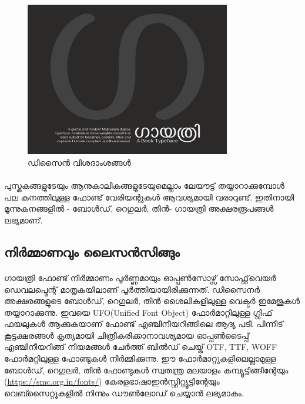 \documentclass[12pt]{article}
\begin{document}
	\begin{figure}
		\begin{centering}
			\includegraphics[width=0.8\textwidth]{ga.jpg}
			\caption{ഡിസൈന്‍ വിശദാംശങ്ങള്‍}
			\label{one}
		\end{centering}
	\end{figure}
	
	\paragraph{}
	പുസ്തകങ്ങളുടേയും ആനുകാലികങ്ങളുടേയുമെല്ലാം ലേയൗട്ട് തയ്യാറാക്കുമ്പോള്‍ പല കനത്തിലുള്ള ഫോണ്ട് വേരിയന്റുകള്‍ ആവശ്യമായി വരാറുണ്ട്. ഇതിനായി മൂന്നുകനങ്ങളില്‍ - ബോള്‍ഡ്, റെഗുലര്‍, തിന്‍- ഗായത്രി അക്ഷരരൂപങ്ങള്‍ ലഭ്യമാണ്. 
	
	\subsection{നിര്‍മ്മാണവും ലൈസന്‍സിങ്ങും}
	
	\paragraph{}
	ഗായത്രി ഫോണ്ട് നിര്‍മ്മാണം പൂര്‍ണ്ണമായും ഓപ്പണ്‍സോഴ്സ് സോഫ്റ്റ്‌വെയര്‍ ഡെവലപ്മെന്റ് മാതൃകയിലാണ് പൂര്‍ത്തിയായിരിക്കുന്നത്. ഡിസൈനര്‍ അക്ഷരങ്ങളുടെ ബോള്‍ഡ്, റെഗുലര്‍, തിന്‍ ശൈലികളിലുള്ള വെക്ടര്‍ ഇമേജുകള്‍ തയ്യാറാക്കുന്നു. ഇവയെ UFO(Unified Font Object) ഫോര്‍മാറ്റിലുള്ള ഗ്ലിഫ് ഫയലുകള്‍ ആക്കുകയാണ് ഫോണ്ട് എഞ്ചിനീയറിങ്ങിലെ ആദ്യ പടി. പിന്നീട് കൂട്ടക്ഷരങ്ങള്‍ കൃത്യമായി ചിത്രീകരിക്കാനാവശ്യമായ ഓപ്പണ്‍ടൈപ്പ് എഞ്ചിനീയറിങ്ങ് നിയമങ്ങള്‍ ചേര്‍ത്ത് ബില്‍ഡ് ചെയ്ത് OTF, TTF, WOFF ഫോര്‍മറ്റിലുള്ള ഫോണ്ടുകള്‍ നിര്‍മ്മിക്കുന്നു. ഈ ഫോര്‍മാറ്റുകളിലെല്ലാമുള്ള ബോള്‍ഡ്, റെഗുലര്‍, തിന്‍ ഫോണ്ടുകള്‍ സ്വതന്ത്ര മലയാളം കമ്പ്യൂട്ടിങ്ങിന്റേയും (\url{https://smc.org.in/fonts/}) കേരളഭാഷാഇന്‍സ്റ്റിറ്റ്യൂട്ടിന്റേയും വെബ്സൈറ്റൂകളില്‍ നിന്നും ഡൗണ്‍ലോഡ് ചെയ്യാന്‍ ലഭ്യമാകും.
	
\end{document}
